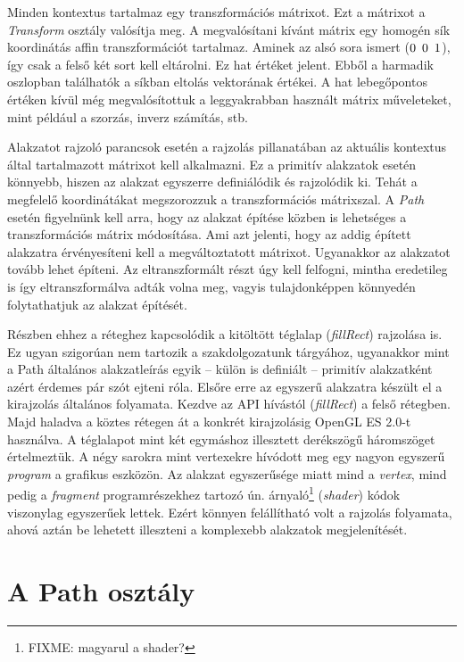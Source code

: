 \documentclass[12pt]{report}
\theoremstyle{definition}
\newcommand{\inenglish}[1]{\textsl{#1}}
\newcommand{\func}[1]{{\textsl{#1}}}
\begin{document}
Minden kontextus tartalmaz egy transzformációs mátrixot. Ezt a mátrixot a
\func{Transform} osztály valósítja meg. A megvalósítani kívánt mátrix egy
homogén sík koordinátás affin transzformációt tartalmaz. Aminek az alsó sora
ismert ($0\enskip 0\enskip 1$), így csak a felső két sort kell eltárolni. Ez
hat értéket jelent. Ebből a harmadik oszlopban találhatók a síkban eltolás
vektorának értékei. A hat lebegőpontos értéken kívül még megvalósítottuk a
leggyakrabban használt mátrix műveleteket, mint például a szorzás, inverz
számítás, stb.

Alakzatot rajzoló parancsok esetén a rajzolás pillanatában az aktuális
kontextus által tartalmazott mátrixot kell alkalmazni. Ez a primitív alakzatok
esetén könnyebb, hiszen az alakzat egyszerre definiálódik és rajzolódik ki.
Tehát a megfelelő koordinátákat megszorozzuk a transzformációs mátrixszal. A
\emph{Path} esetén figyelnünk kell arra, hogy az alakzat építése közben is
lehetséges a transzformációs mátrix módosítása. Ami azt jelenti, hogy az addig
épített alakzatra érvényesíteni kell a megváltoztatott mátrixot. Ugyanakkor az
alakzatot tovább lehet építeni. Az eltranszformált részt úgy kell felfogni,
mintha eredetileg is így eltranszformálva adták volna meg, vagyis
tulajdonképpen könnyedén folytathatjuk az alakzat építését.

Részben ehhez a réteghez kapcsolódik a kitöltött téglalap (\func{fillRect})
rajzolása is. Ez ugyan szigorúan nem tartozik a szakdolgozatunk tárgyához,
ugyanakkor mint a Path általános alakzatleírás egyik -- külön is definiált --
primitív alakzatként azért érdemes pár szót ejteni róla. Elsőre erre az
egyszerű alakzatra készült el a kirajzolás általános folyamata. Kezdve az API
hívástól (\func{fillRect}) a felső rétegben. Majd haladva a köztes rétegen át a
konkrét kirajzolásig OpenGL ES 2.0-t használva. A téglalapot mint két egymáshoz
illesztett derékszögű háromszöget értelmeztük. A négy sarokra mint vertexekre
hívódott meg egy nagyon egyszerű \emph{program} a grafikus eszközön. Az alakzat
egyszerűsége miatt mind a \emph{vertex}, mind pedig a \emph{fragment}
programrészekhez tartozó ún. árnyaló\footnote{FIXME: magyarul a shader?}
(\inenglish{shader}) kódok viszonylag egyszerűek lettek. Ezért könnyen
felállítható volt a rajzolás folyamata, ahová aztán be lehetett illeszteni a
komplexebb alakzatok megjelenítését.

    \section[A Path osztály]{A Path osztály}
    \label{A Path osztály}
\end{document}
